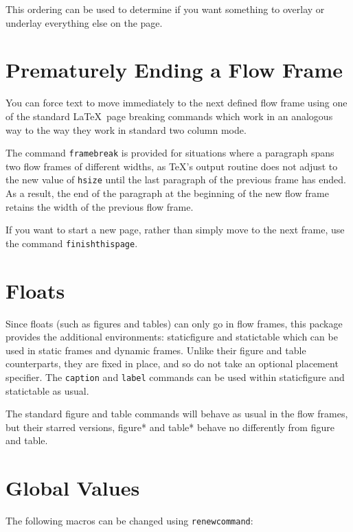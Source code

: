 \documentclass[a4paper,twoside]{book}
\newcommand{\env}[1]{\textsf{#1}}
\newcommand{\cmdname}[1]{\texttt{\symbol{92}#1}}
\begin{document}
This ordering can be used to determine if you want something
to overlay or underlay everything else on the page.

\section{Prematurely Ending a Flow Frame}

You can force text to move immediately to the next defined
flow frame using one of the standard \LaTeX\ page breaking commands
which  work in an analogous way to the way they
work in standard two column mode.

The command \cmdname{framebreak} is provided for situations
where a paragraph spans two flow frames
of different widths, as \TeX's output routine does not
adjust to the new value of \cmdname{hsize} until the last
paragraph of the previous frame has ended. As a
result, the end of the paragraph at the beginning of the new
flow frame retains the width of the previous flow frame.

If you want to start a new page, rather than simply move to the
next frame, use the command\newline
\cmdname{finishthispage}.

\section{Floats}

Since floats (such as figures and tables) can only go in
{flow frames}, this package provides
the additional environments:
\env{staticfigure} and
\env{statictable} which can be used in static frames
and dynamic frames. Unlike their \env{figure} and
\env{table} counterparts, they are fixed in place, and
so do not take an optional placement specifier. The
\cmdname{caption} and \cmdname{label} commands can
be used within \env{staticfigure} and \env{statictable} as
usual.

The standard \env{figure} and \env{table} commands will
behave as usual in the flow frames, but their starred versions,
\env{figure*} and \env{table*} behave no differently
from \env{figure} and \env{table}.

\section{Global Values}

The following macros can be changed using \cmdname{renewcommand}:
\end{document}
